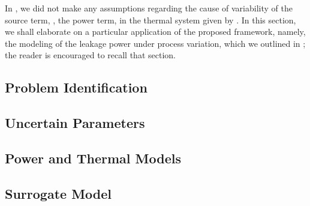 In , we did not make any assumptions regarding the cause of variability of the source term, \ie, the power term, in the thermal system given by . In this section, we shall elaborate on a particular application of the proposed framework, namely, the modeling of the leakage power under process variation, which we outlined in ; the reader is encouraged to recall that section.

\subsection{Problem Identification} 


\subsection{Uncertain Parameters} 


\subsection{Power and Thermal Models}  


\subsection{Surrogate Model} 

